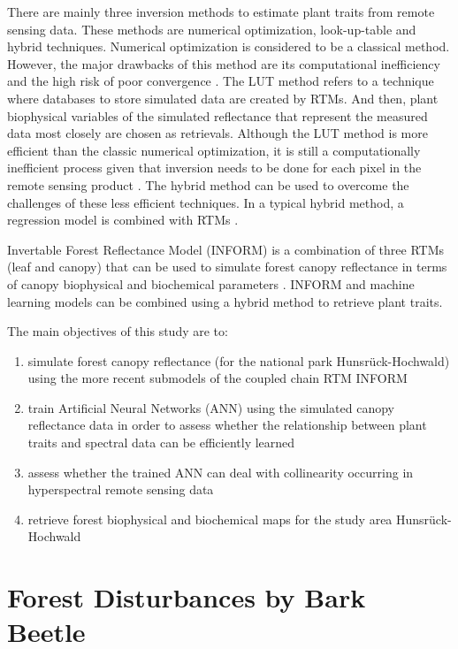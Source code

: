 \documentclass[a4paper, twoside]{templates/ociamthesis}
\providecommand{\tightlist}{%
  \setlength{\itemsep}{0pt}\setlength{\parskip}{0pt}}
\begin{document}
There are mainly three inversion methods to estimate plant traits from remote sensing data. These methods are numerical optimization, look-up-table and hybrid techniques. Numerical optimization is considered to be a classical method. However, the major drawbacks of this method are its computational inefficiency and the high risk of poor convergence \citep{zhang2021analyzing}. The LUT method refers to a technique where databases to store simulated data are created by RTMs. And then, plant biophysical variables of the simulated reflectance that represent the measured data most closely are chosen as retrievals. Although the LUT method is more efficient than the classic numerical optimization, it is still a computationally inefficient process given that inversion needs to be done for each pixel in the remote sensing product \citep{danner2021efficient}. The hybrid method can be used to overcome the challenges of these less efficient techniques. In a typical hybrid method, a regression model is combined with RTMs \citep{zhang2021analyzing}.

Invertable Forest Reflectance Model (INFORM) is a combination of three RTMs (leaf and canopy) that can be used to simulate forest canopy reflectance in terms of canopy biophysical and biochemical parameters \citep{atzberger2000development, schlerf2006inversion}. INFORM and machine learning models can be combined using a hybrid method to retrieve plant traits.

The main objectives of this study are to:

\begin{enumerate}
\def\labelenumi{\arabic{enumi}.}
\tightlist
\item
  simulate forest canopy reflectance (for the national park Hunsrück-Hochwald) using the more recent submodels of the coupled chain RTM INFORM
\item
  train Artificial Neural Networks (ANN) using the simulated canopy reflectance data in order to assess whether the relationship between plant traits and spectral data can be efficiently learned
\item
  assess whether the trained ANN can deal with collinearity occurring in hyperspectral remote sensing data
\item
  retrieve forest biophysical and biochemical maps for the study area Hunsrück-Hochwald
\end{enumerate}

\hypertarget{forest-disturbances-by-bark-beetle}{%
\chapter{Forest Disturbances by Bark Beetle}\label{forest-disturbances-by-bark-beetle}}
\end{document}
